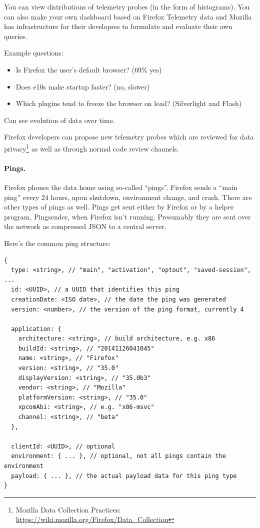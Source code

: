 \documentclass[a4paper]{report}
\begin{document}
You can view distributions of telemetry probes (in the form of
histograms). You can also make your own dashboard based on Firefox
Telemetry data and Mozilla has infrastructure for their developres to
formulate and evaluate their own queries.

Example questions:
\begin{itemize}[noitemsep]
\item Is Firefox the user's default browser? (69\% yes)
\item Does e10s make startup faster? (no, slower)
\item Which plugins tend to freeze the browser on load? (Silverlight and Flash)
\end{itemize}
Can see evolution of data over time.

Firefox developers can propose new telemetry probes which are reviewed
for data privacy\footnote{Mozilla Data Collection Practices: \url{https://wiki.mozilla.org/Firefox/Data_Collection}} as well as through normal code review channels.

\paragraph{Pings.} Firefox phones the data home using so-called ``pings''.
Firefox sends a ``main ping'' every 24 hours, upon shutdown, environment change,
and crash. There are other types of pings as well. Pings get sent either by Firefox
or by a helper program, Pingsender, when Firefox isn't running. Presumably they
are sent over the network as compressed JSON to a central server.

Here's the common ping structure:

\begin{verbatim}
{
  type: <string>, // "main", "activation", "optout", "saved-session", ...
  id: <UUID>, // a UUID that identifies this ping
  creationDate: <ISO date>, // the date the ping was generated
  version: <number>, // the version of the ping format, currently 4

  application: {
    architecture: <string>, // build architecture, e.g. x86
    buildId: <string>, // "20141126041045"
    name: <string>, // "Firefox"
    version: <string>, // "35.0"
    displayVersion: <string>, // "35.0b3"
    vendor: <string>, // "Mozilla"
    platformVersion: <string>, // "35.0"
    xpcomAbi: <string>, // e.g. "x86-msvc"
    channel: <string>, // "beta"
  },

  clientId: <UUID>, // optional
  environment: { ... }, // optional, not all pings contain the environment
  payload: { ... }, // the actual payload data for this ping type
}
\end{verbatim}
\end{document}
